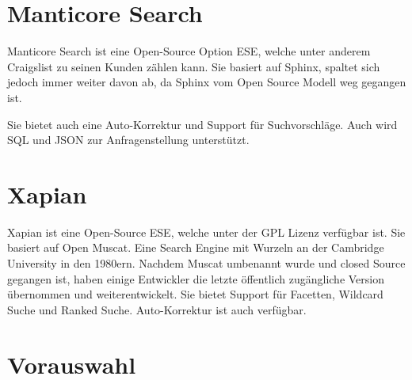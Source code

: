 \cite{Elasticsearch.2019}

\section{Manticore Search}

Manticore Search ist eine Open-Source Option ESE, welche unter anderem Craigslist zu seinen Kunden zählen kann. Sie basiert auf Sphinx, spaltet sich jedoch immer weiter davon ab, da Sphinx vom Open Source Modell weg gegangen ist.

Sie bietet auch eine Auto-Korrektur und Support für Suchvorschläge. Auch wird SQL und JSON zur Anfragenstellung unterstützt.

\cite{ManticoreSoftwareLtd.2019}


\section{Xapian}

Xapian ist eine Open-Source ESE, welche unter der GPL Lizenz verfügbar ist. Sie basiert auf Open Muscat. Eine Search Engine mit Wurzeln an der Cambridge University in den 1980ern. Nachdem Muscat umbenannt wurde und closed Source gegangen ist, haben einige Entwickler die letzte öffentlich zugängliche Version übernommen und weiterentwickelt.
Sie bietet Support für Facetten, Wildcard Suche und Ranked Suche. Auto-Korrektur ist auch verfügbar.

\cite{XAP.2019}

\section {Vorauswahl}

